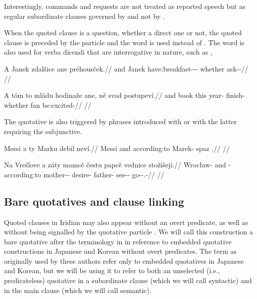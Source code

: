 Interestingly, commands and requests are not treated as reported speech but as
regular subordinate clauses governed by  and not by .

When the quoted clause is a question, whether a direct one or not, the quoted
clause is preceded by the particle  and the word
 is used instead of . The word  is also
used for verba dicendi that are interrogative in nature, such as
,

\pex
\begingl
  \gla A Janek zdalšice ane préhousček.//
  \glb and Janek have:breakfast-\Av{}-\Pf{}-\Quot{} whether ask-\Av{}-\Pf{}//
  \glft {}//
\endgl
\xe

\pex
\begingl
  \gla A tóm to mládu hodinaže ane, ně svad postupeví.//
  \glb and book this year-\Ins{} finish- whether \Pl{} fan be:excited-//
  \glft {}//
\endgl
\xe

The quotative is also triggered by phrases introduced with  or  with the latter requiring the subjunctive. 

\pex
\begingl
  \gla Messi a ty Marku debil neví.//
  \glb Messi and according:to Marek-\Ins{} spaz \Cop{}.\Sbj{}//
  \glft {}//
\endgl
\xe

\pex
\begingl
  \gla Na Vrešlove a záty mamcě čestu papcě vednice stožišejí.//
  \glb \Loc{} Wrocław-\Acc{} and \Neg{}-according:to mother-\Dim{}-\Gen{} desire-\Ins{} father-\Gen{} see-\Pv{}-\SupP{} go-\Av{}-\Subj{}.\Pf{}-\Quot{}//
  \glft {}//
\endgl
\xe


\subsection{Bare quotatives and clause linking}

Quoted clauses in Iridian may also appear without an overt predicate, as well as
without being signalled by the quotative particle . We will call this
construction a {\sc bare quotative} after the terminology in
\textcite{tomioka2019} in reference to embedded quotative constructions in
Japanese and Korean without overt predicates. The term as originally used by
these authors refer only to embedded quotatives in Japanese and Korean, but we
will be using it to refer to both an unselected (i.e., predicateless) quotative
in a subordinate clause (which we will call {\sc syntactic}) and in the main
clause (which we will call {\sc semantic}).


